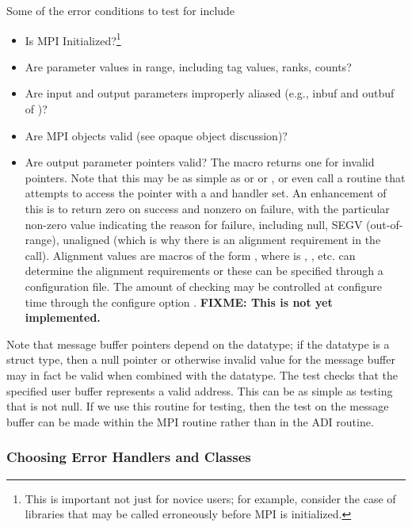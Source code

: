 \documentclass{article}
\def\fixme#1{\marginpar{FIXME:}\textbf{FIXME: #1}}
\begin{document}
Some of the error conditions to test for include
\begin{itemize}
\item Is MPI Initialized?\footnote{This is important not just for
novice users; for example, consider the case of libraries that may be
called erroneously before MPI is initialized.}
\item Are parameter values in range, including tag values, ranks, counts?
\item Are input and output parameters improperly aliased (e.g., inbuf and
  outbuf of   )?
\item Are MPI objects valid (see opaque object discussion)?
\item Are output parameter pointers valid?  The macro
   returns one for
invalid pointers. 
  Note that this may be as simple as  or
   or , or
  even call a routine that attempts to access the pointer with a
   and  handler set.  An enhancement of
this is to return 
zero on success and nonzero on failure, with the particular non-zero
value indicating the reason for failure, including null, SEGV
(out-of-range), unaligned (which is why there is an alignment
requirement in the call). Alignment values are macros of the form
, where  is , ,
etc.   can determine the alignment requirements or
these can be specified through a configuration file.
The amount of checking may be controlled at configure time through the
configure option .
  \fixme{This is not yet implemented.}
\end{itemize}
Note that message buffer pointers depend on the datatype; if the datatype is a
struct type, then a null pointer or otherwise invalid value for the message
buffer may in fact be valid when combined with the datatype.
The test  checks that the
specified user buffer represents a valid address.  This can be as simple as
testing that  is not null.  If we
use 
this routine for testing, then the test on the message buffer can be made
within the MPI routine rather than in the ADI routine.

\subsubsection{Choosing Error Handlers and Classes}
\label{sec:chosing-errhandler}
\end{document}
